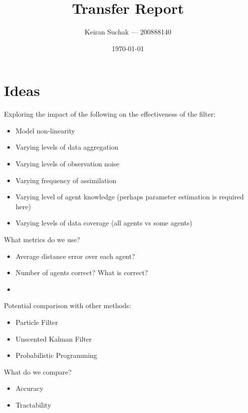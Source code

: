 \documentclass[a4paper, 11pt]{article}
\begin{document}
\title{Transfer Report}
\author{Keiran Suchak --- 200888140}
\date{\today}
\maketitle

\tableofcontents

\newpage

\section*{Ideas}\label{sec:ideas}

Exploring the impact of the following on the effectiveness of the filter:
\begin{itemize}
    \item Model non-linearity
    \item Varying levels of data aggregation
    \item Varying levels of observation noise
    \item Varying frequency of assimilation
    \item Varying level of agent knowledge (perhaps parameter estimation is
        required here)
    \item Varying levels of data coverage (all agents vs some agents)
\end{itemize}

What metrics do we use?
\begin{itemize}
    \item Average distance error over each agent?
    \item Number of agents correct? What is correct?
    \item 
\end{itemize}

Potential comparison with other methods:
\begin{itemize}
    \item Particle Filter
    \item Unscented Kalman Filter
    \item Probabilistic Programming
\end{itemize}

What do we compare?
\begin{itemize}
    \item Accuracy
    \item Tractability
\end{itemize}













%

%



\end{document}
